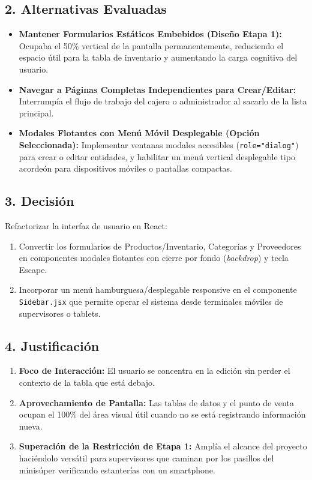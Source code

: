 \documentclass[11pt,a4paper]{article}
\begin{document}
\subsection{2. Alternativas Evaluadas}
\begin{itemize}[leftmargin=*]
    \item \textbf{Mantener Formularios Estáticos Embebidos (Diseño Etapa 1):} Ocupaba el 50\% vertical de la pantalla permanentemente, reduciendo el espacio útil para la tabla de inventario y aumentando la carga cognitiva del usuario.
    \item \textbf{Navegar a Páginas Completas Independientes para Crear/Editar:} Interrumpía el flujo de trabajo del cajero o administrador al sacarlo de la lista principal.
    \item \textbf{Modales Flotantes con Menú Móvil Desplegable (Opción Seleccionada):} Implementar ventanas modales accesibles (\texttt{role="dialog"}) para crear o editar entidades, y habilitar un menú vertical desplegable tipo acordeón para dispositivos móviles o pantallas compactas.
\end{itemize}

\subsection{3. Decisión}
Refactorizar la interfaz de usuario en React:
\begin{enumerate}
    \item Convertir los formularios de Productos/Inventario, Categorías y Proveedores en componentes modales flotantes con cierre por fondo (\textit{backdrop}) y tecla Escape.
    \item Incorporar un menú hamburguesa/desplegable responsive en el componente \texttt{Sidebar.jsx} que permite operar el sistema desde terminales móviles de supervisores o tablets.
\end{enumerate}

\subsection{4. Justificación}
\begin{enumerate}
    \item \textbf{Foco de Interacción:} El usuario se concentra en la edición sin perder el contexto de la tabla que está debajo.
    \item \textbf{Aprovechamiento de Pantalla:} Las tablas de datos y el punto de venta ocupan el 100\% del área visual útil cuando no se está registrando información nueva.
    \item \textbf{Superación de la Restricción de Etapa 1:} Amplía el alcance del proyecto haciéndolo versátil para supervisores que caminan por los pasillos del minisúper verificando estanterías con un smartphone.
\end{enumerate}
\end{document}
